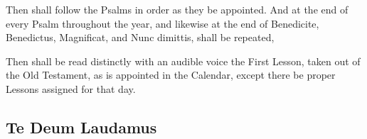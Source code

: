 \begin{rubric}
Then shall follow the Psalms in order as they be appointed. And at the end of every Psalm throughout the year, and likewise at the end of Benedicite, Benedictus, Magnificat, and Nunc dimittis, shall be repeated,
\end{rubric}


\begin{rubric}
Then shall be read distinctly with an audible voice the First Lesson, taken out of the Old Testament, as is appointed in the Calendar, except there be proper Lessons assigned for that day.
\end{rubric}

\subsection{Te Deum Laudamus}

